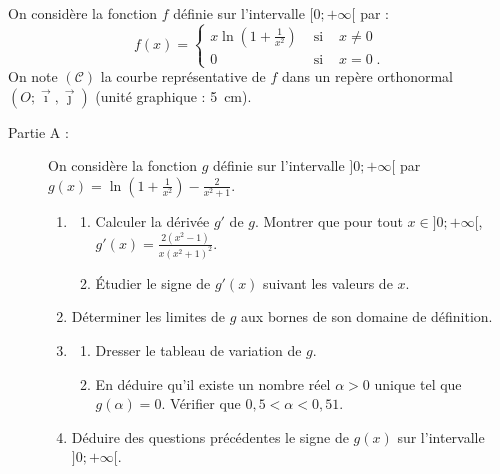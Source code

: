\begin{exo}
      On consid\`ere la fonction $f$ d\'efinie sur l'intervalle $[0 ; +\infty[$ par :
      \[
      f(x) = 
            \left\lbrace
                  \begin{array}{lcl}
                        x \ln \left( 1 + \frac{1}{x^2} \right) & \text{ si } & x \neq 0 \\
                        0                                      & \text{ si } & x = 0 \;.
                  \end{array}
            \right.
      \]
      On note $(\mathscr{C})$ la courbe repr\'esentative de $f$
      dans un rep\`ere orthonormal $(O ; \vec{\imath} , \vec{\jmath})$ (unit\'e graphique : 5~cm).
      \begin{description}
            \item[Partie A :]
                  On consid\`ere la fonction $g$ d\'efinie sur l'intervalle $]0 ; +\infty[$ par 
                  $g(x) = \ln \left( 1 + \frac{1}{x^2} \right) - \frac{2}{x^2 + 1}$.
                  \begin{enumerate}
                        \item \begin{enumerate}
                                    \item Calculer la d\'eriv\'ee $g'$ de $g$.
                                          Montrer que pour tout $x \in ]0 ; +\infty[$, 
                                          $g'(x) = \frac{2 (x^2 -1)}{x (x^2 + 1)^2}$.
                                    \item \'Etudier le signe de $g'(x)$ suivant les valeurs de $x$.
                              \end{enumerate}
                        \item D\'eterminer les limites de $g$ aux bornes de son domaine de d\'efinition.
                        \item \begin{enumerate}
                                    \item Dresser le tableau de variation de $g$.
                                    \item En d\'eduire qu'il existe un nombre r\'eel $\alpha > 0$ unique tel que 
                                          $g(\alpha) = 0$.
                                          V\'erifier que $0,5 < \alpha < 0,51$.
                              \end{enumerate}
                        \item D\'eduire des questions pr\'ec\'edentes le signe de $g(x)$ sur l'intervalle $]0 ; +\infty[$.

\end{enumerate}
\end{description}
\end{exo}
